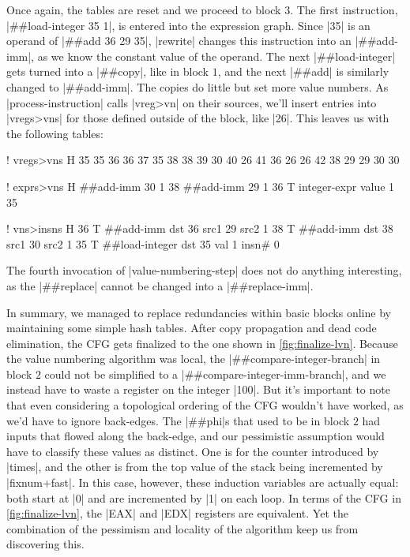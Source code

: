 Once again, the tables are reset and we proceed to block $3$.  The first
instruction,
%
\factor|##load-integer 35 1|,
%
is entered into the expression graph.  Since \factor|35| is an operand of
%
\factor|##add 36 29 35|,
%
\factor|rewrite| changes this instruction into an \factor|##add-imm|, as we
know the constant value of the operand.  The next \factor|##load-integer| gets
turned into a \factor|##copy|, like in block $1$, and the next \factor|##add|
is similarly changed to \factor|##add-imm|.  The copies do little but set more
value numbers.  As \factor|process-instruction| calls \factor|vreg>vn| on their
sources, we'll insert entries into \factor|vregs>vns| for those defined outside
of the block, like \factor|26|.  This leaves us with the following tables:
%
  \begin{factorcode}
    ! vregs>vns
    H{
        { 35 35 }
        { 36 36 }
        { 37 35 }
        { 38 38 }
        { 39 30 }
        { 40 26 }
        { 41 36 }
        { 26 26 }
        { 42 38 }
        { 29 29 }
        { 30 30 }
    }

    ! exprs>vns
    H{
        { { ##add-imm 30 1 } 38 }
        { { ##add-imm 29 1 } 36 }
        { T{ integer-expr { value 1 } } 35 }
    }

    ! vns>insns
    H{
        { 36 T{ ##add-imm { dst 36 } { src1 29 } { src2 1 } } }
        { 38 T{ ##add-imm { dst 38 } { src1 30 } { src2 1 } } }
        { 35 T{ ##load-integer { dst 35 } { val 1 } { insn# 0 } } }
    }
  \end{factorcode}
%
\noindent The fourth invocation of \factor|value-numbering-step| does not do
anything interesting, as the \factor|##replace| cannot be changed into a
\factor|##replace-imm|.


In summary, we managed to replace redundancies within basic blocks online by
maintaining some simple hash tables.  After copy propagation and dead code
elimination, the \gls{CFG} gets finalized to the one shown in
\vref{fig:finalize-lvn}.  Because the value numbering algorithm was local, the
\factor|##compare-integer-branch| in block $2$ could not be simplified to a
\factor|##compare-integer-imm-branch|, and we instead have to waste a register
on the integer \factor|100|.  But it's important to note that even considering
a topological ordering of the \gls{CFG} wouldn't have worked, as we'd have to
ignore back-edges.  The \factor|##phi|s that used to be in block $2$ had inputs
that flowed along the back-edge, and our pessimistic assumption would have to
classify these values as distinct.  One is for the counter introduced by
\factor|times|, and the other is from the top value of the stack being
incremented by \factor|fixnum+fast|.  In this case, however, these induction
variables are actually equal: both start at \factor|0| and are incremented by
\factor|1| on each loop.  In terms of the \gls{CFG} in \vref{fig:finalize-lvn},
the \factor|EAX| and \factor|EDX| registers are equivalent.  Yet the
combination of the pessimism and locality of the algorithm keep us from
discovering this.
